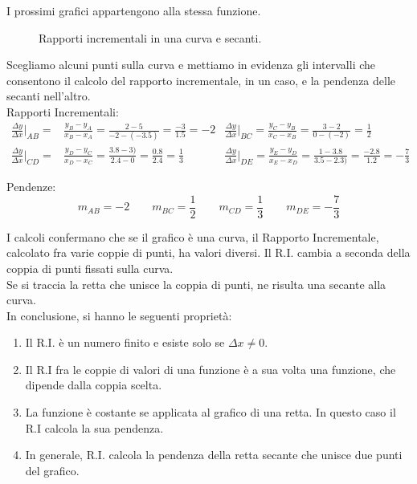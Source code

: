 \begin{esempio}
I prossimi grafici appartengono alla stessa funzione.

\begin{figure}[h]
\begin{inaccessibleblock}
 \begin{minipage}[]{.45\textwidth}
 \curvacubica
 \end{minipage} 
 \hfill
 \begin{minipage}[]{.55\textwidth}
  \secanticubica
 \end{minipage}
\end{inaccessibleblock}
\caption{Rapporti incrementali in una curva e secanti.} 
\label{}
\end{figure}

Scegliamo alcuni punti sulla curva e mettiamo in evidenza gli intervalli che
consentono il calcolo del rapporto incrementale, in un caso, e la pendenza 
delle secanti nell'altro.\\
Rapporti Incrementali:
\begin{align*}
  \frac{\Delta y}{\Delta x}\bigg\lvert_{AB}= &\frac{y_B-y_A}{x_B-x_A}=
    \frac{2-5}{-2-(-3.5)}=\frac{-3}{1.5}=-2 &
  \frac{\Delta y}{\Delta x}\bigg\rvert_{BC}=\frac{y_C-y_B}{x_C-x_B}=
  \frac{3-2}{0-(-2)}=\frac{1}{2}\\
  \frac{\Delta y}{\Delta x}\bigg\lvert_{CD}= &\frac{y_D-y_C}{x_D-x_C}=
  \frac{3.8-3)}{2.4-0}=\frac{0.8}{2.4}=\frac{1}{3} &
  \frac{\Delta y}{\Delta x}\bigg\rvert_{DE}=\frac{y_E-y_D}{x_E-x_D}=
  \frac{1-3.8}{3.5-2.3)}=\frac{-2.8}{1.2}=-\frac{7}{3}
\end{align*}

Pendenze:
$$  m_{AB}=-2 \qquad m_{BC}=\frac{1}{2}\qquad m_{CD}=\frac{1}{3}\qquad  
m_{DE}=-\frac{7}{3}$$
\end{esempio}

I calcoli confermano che se il grafico è una curva, il Rapporto 
Incrementale, 
calcolato fra varie coppie di punti, ha valori diversi. 
Il R.I. cambia a seconda della coppia di punti fissati sulla curva.\\
Se si traccia la retta che unisce la coppia di punti, ne risulta una secante
alla curva.\\
In conclusione, si hanno le seguenti proprietà:

\begin{enumerate}
\item Il R.I. è un numero finito e esiste solo se $\Delta x\ne 0$.
\item Il R.I fra le coppie di valori di una funzione è 
 a sua volta una funzione, che dipende dalla coppia scelta. 
 \item La funzione è costante se applicata al grafico di una retta. In 
questo 
 caso il R.I calcola  la sua pendenza.
\item  In generale, R.I. calcola la pendenza della retta secante che unisce 
due punti del grafico.
\end{enumerate}


